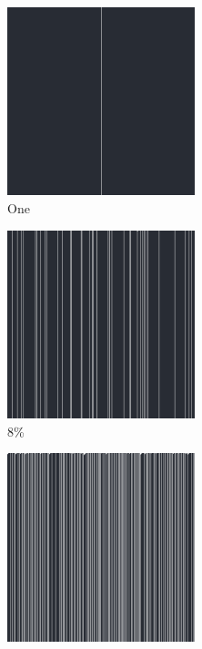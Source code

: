 \documentclass[12pt, fleqn]{report}                             %
\theoremstyle{break}                                            %
\begin{document}
      \begin{figure}[ht!]
        \centering
        \begin{subfigure}[b]{0.4\linewidth}
          \includegraphics[width=0.6\textwidth]{Images/140/a.png}
          \caption{One}
        \end{subfigure}
        \begin{subfigure}[b]{0.4\linewidth}
          \includegraphics[width=0.6\textwidth]{Images/140/b.png}
          \caption{8\%}
        \end{subfigure}
        \begin{subfigure}[b]{0.4\linewidth}
          \includegraphics[width=0.6\textwidth]{Images/140/c.png}

\end{subfigure}
\end{figure}
\end{document}
